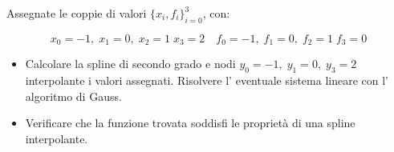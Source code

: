 Assegnate le coppie di valori $\{x_i,f_i \}_{i=0}^3$, con:

\[ x_0=-1, \; x_1=0, \; x_2=1  \; x_3=2 \quad f_0=-1, \; f_1=0, \; f_2=1  \; f_3=0\]

\begin{itemize}
\item Calcolare la spline di secondo grado e nodi
$y_0=-1, \; y_1=0, \; y_3=2$ interpolante i valori assegnati.
Risolvere l' eventuale sistema lineare con l' algoritmo di  Gauss.
\item Verificare che la funzione trovata soddisfi le propriet\`a
di una spline interpolante.

\end{itemize}
